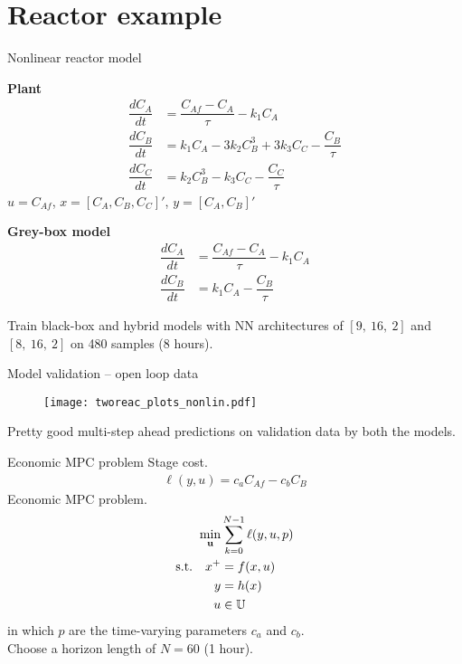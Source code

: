 \documentclass[xcolor=dvipsnames, 8pt]{beamer} %
\newcommand{\useq}{\mathbf{u}}
\newcommand{\bbU}{\mathbb{U}}
\begin{document}
\section{Reactor example}

\begin{frame}{Nonlinear reactor model}

\textbf{Plant}
\begin{align*}
	\dfrac{dC_A}{dt} &= \dfrac{C_{Af} - C_A}{\tau} - k_1C_A\\
	\dfrac{dC_B}{dt} &= k_1C_A - 3k_2C^3_B + 3k_3C_C- \dfrac{C_B}{\tau}\\
	\dfrac{dC_C}{dt} &= k_2C^3_B - k_3C_C - \dfrac{C_C}{\tau}
\end{align*}
$u = C_{Af}$, $x = [C_A, C_B, C_C]'$, $y = [C_A, C_B]'$

\vspace{0.2in}
\textbf{Grey-box model}
\begin{align*}
  \dfrac{dC_A}{dt} &= \dfrac{C_{Af} - C_A}{\tau} - k_1C_A\\
  \dfrac{dC_B}{dt} &= k_1C_A - \dfrac{C_B}{\tau}
\end{align*}

\vspace{0.2in}
Train black-box and hybrid models with NN 
architectures of $[9, \ 16, \ 2]$ and $[8, \ 16, \ 2]$
on 480 samples (8 hours).
\end{frame}

\begin{frame}{Model validation -- open loop data}
\vspace{-0.1in}
\begin{figure}
\centering
\texttt{[image: tworeac\_plots\_nonlin.pdf]}
\end{figure}
\vspace{-0.2in}
Pretty good multi-step ahead predictions on validation data 
by both the models. 
\end{frame}

\begin{frame}{Economic MPC problem}
Stage cost.
\begin{align*}
		\ell(y, u) = c_aC_{Af} - c_bC_B
\end{align*}
Economic MPC problem.
\begin{align*}
	\min_{\useq} & 
  \sum_{k=0}^{N-1} \ell(y, u, p) \\
	\textnormal{s.t.} \quad   x^+ &= f(x, u)\\
	y &= h(x) \\ 
	u &\in \bbU
  \end{align*}
  in which $p$ are the time-varying parameters $c_a$ and $c_b$. \\
  Choose a horizon length of $N=60$ (1 hour). 
\end{frame}
	
\end{document}
